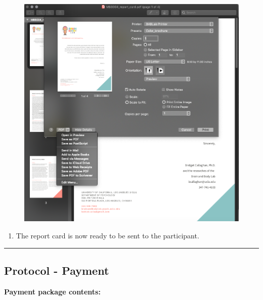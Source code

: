 \documentclass[]{book}
\providecommand{\tightlist}{%
  \setlength{\itemsep}{0pt}\setlength{\parskip}{0pt}}
\begin{document}
\begin{figure}
\centering
\includegraphics{images/report_card_online/6.png}
\caption{}
\end{figure}

\begin{enumerate}
\def\labelenumi{\arabic{enumi}.}
\setcounter{enumi}{6}
\tightlist
\item
  The report card is now ready to be sent to the participant.
\end{enumerate}

\begin{center}\rule{0.5\linewidth}{0.5pt}\end{center}

\hypertarget{protocol---payment}{%
\subsection{Protocol - Payment}\label{protocol---payment}}

\textbf{Payment package contents:}
\end{document}
